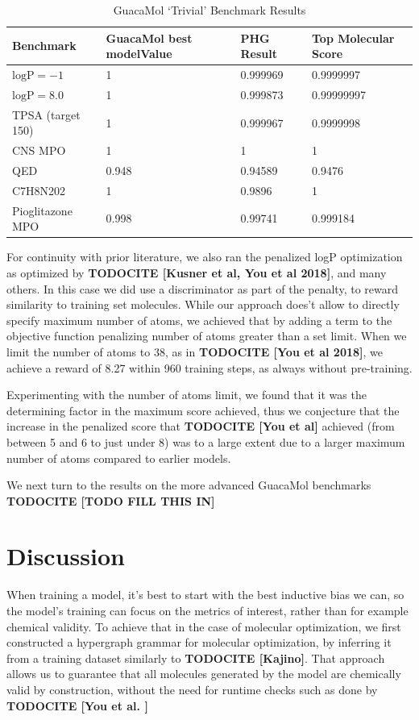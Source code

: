 \documentclass{article}
\newcommand{\CITE}[1]{{\bf TODOCITE [#1]}}
\begin{document}
\begin{table}
    \caption{GuacaMol `Trivial' Benchmark Results}
    \label{tab:guac-trivial}
    \centering
    \begin{tabular}{llll}
        \toprule
        Benchmark & GuacaMol best modelValue & PHG Result & Top Molecular Score \\
        \midrule
        $\text{logP} = -1$ & 1 & 0.999969 & 0.9999997 \\
        $\text{logP} = 8.0$ & 1 & 0.999873 & 0.99999997 \\
        TPSA (target 150) & 1 & 0.999967 & 0.9999998 \\
        CNS MPO & 1 & 1 & 1 \\
        QED & 0.948 & 0.94589 & 0.9476 \\
        C7H8N202 & 1 & 0.9896 & 1 \\
        Pioglitazone MPO & 0.998 & 0.99741 & 0.999184 \\
        \bottomrule
    \end{tabular}
\end{table}

For continuity with prior literature, we also ran the penalized logP optimization as optimized by \CITE{Kusner et al, You et al 2018}, and many others. In this case we did use a discriminator as part of the penalty, to reward similarity to training set molecules. While our approach does't allow to directly specify maximum number of atoms, we achieved that by adding a term to the objective function penalizing number of atoms greater than a set limit. When we limit the number of atoms to 38, as in \CITE{You et al 2018}, we achieve a reward of 8.27 within 960 training steps, as always without pre-training. 

Experimenting with the number of atoms limit, we found that it was the determining factor in the maximum score achieved, thus we conjecture that the increase in the penalized score that \CITE{You et al} achieved (from between 5 and 6 to just under 8) was to a large extent due to a larger maximum number of atoms compared to earlier models.



We next turn to the results on the more advanced GuacaMol benchmarks \CITE{TODO FILL THIS IN}

\section{Discussion}
When training a model, it's best to start with the best inductive bias we can, so the model's training can focus on the metrics of interest, rather than for example chemical validity. To achieve that in the case of molecular optimization, we first constructed a hypergraph grammar for molecular optimization, by inferring it from a training dataset similarly to \CITE{Kajino}. That approach allows us to guarantee that all molecules generated by the model are chemically valid by construction, without the need for runtime checks such as done by \CITE{You et al. }
\end{document}
